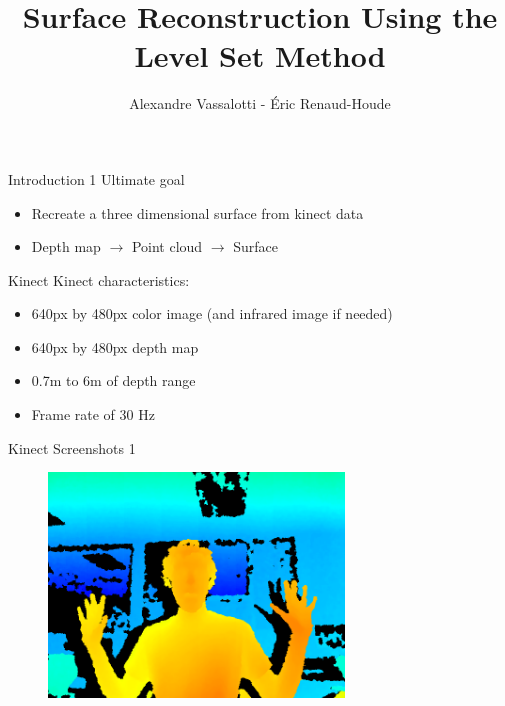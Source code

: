 \documentclass{beamer}
\title{Surface Reconstruction Using the Level Set Method}
\author{Alexandre Vassalotti - \'{E}ric Renaud-Houde}
\begin{document}
\begin{frame}[plain]
  \titlepage
\end{frame}

\begin{frame}{Introduction 1}
Ultimate goal
\begin{itemize}
  \item Recreate a three dimensional surface from kinect data
  \item Depth map $\rightarrow$ Point cloud $\rightarrow$ Surface 
\end{itemize}
\end{frame}

\begin{frame}{Kinect}
Kinect characteristics:
\begin{itemize}
\item 640px by 480px color image (and infrared image if needed)
\item 640px by 480px depth map
\item 0.7m to 6m of depth range
\item Frame rate of 30 Hz
\end{itemize}
\end{frame}

\begin{frame}{Kinect Screenshots 1}
\begin{figure}[H]
  \centering
  \includegraphics[width=0.7\textwidth]{img/depthmap.png}
  \end{figure}
\end{frame}
\end{document}
